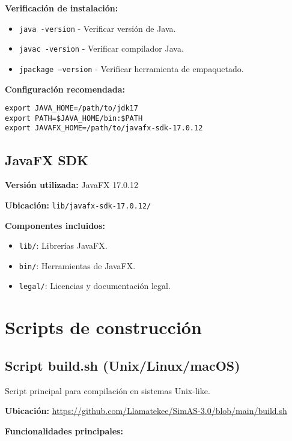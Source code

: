 \textbf{Verificación de instalación:}
\begin{itemize}
    \item \texttt{java -version} - Verificar versión de Java.
    \item \texttt{javac -version} - Verificar compilador Java.
    \item \texttt{jpackage --version} - Verificar herramienta de empaquetado.
\end{itemize}

\textbf{Configuración recomendada:}
\begin{lstlisting}[caption=Configuración de variables de entorno]
export JAVA_HOME=/path/to/jdk17
export PATH=$JAVA_HOME/bin:$PATH
export JAVAFX_HOME=/path/to/javafx-sdk-17.0.12
\end{lstlisting}

\subsection{JavaFX SDK}

\textbf{Versión utilizada:} JavaFX 17.0.12

\textbf{Ubicación:} \texttt{lib/javafx-sdk-17.0.12/}

\textbf{Componentes incluidos:}
\begin{itemize}
    \item \texttt{lib/}: Librerías JavaFX.
    \item \texttt{bin/}: Herramientas de JavaFX.
    \item \texttt{legal/}: Licencias y documentación legal.
\end{itemize}

\section{Scripts de construcción}

\subsection{Script build.sh (Unix/Linux/macOS)}

Script principal para compilación en sistemas Unix-like.

\textbf{Ubicación:} \url{https://github.com/Llamatekee/SimAS-3.0/blob/main/build.sh}

\textbf{Funcionalidades principales:}

